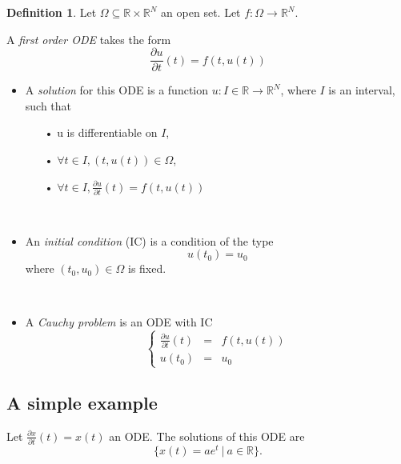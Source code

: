 \documentclass[10pt,a4paper]{article}
\theoremstyle{definition}
\newtheorem{definition}{Definition}
\theoremstyle{definition}
\theoremstyle{definition}
\begin{document}
\begin{definition}
Let $\Omega \subseteq \mathbb{R} \times \mathbb{R}^N$ an open set. Let $f: \Omega \rightarrow \mathbb{R}^N$. 

A \textit{first order ODE} takes the form
$$
\frac{\partial u}{\partial t}(t) = f(t,u(t))
$$

\begin{itemize}
\item A \textit{solution} for this ODE is a function $u : I\in \mathbb{R} \rightarrow \mathbb{R}^N$, where $I$ is an interval, such that
	\begin{itemize}
	\item[•] u is differentiable on $I$,
	\item[•] $\forall t \in I, (t, u(t)) \in \Omega$,
	\item[•] $\forall t \in I, \frac{\partial u}{\partial t}(t) = f(t, u(t))$
	\end{itemize}
~

\item An \textit{initial condition} (IC) is a condition of the type
$$
u(t_0) = u_0
$$
where $(t_0, u_0) \in \Omega$ is fixed.

~

\item A \textit{Cauchy problem} is an ODE with IC
$$
\left \{
\begin{array}{rcl}
\frac{\partial u}{\partial t}(t) & = & f(t, u(t)) \\
u(t_0) & = & u_0
\end{array}
\right.
$$
\end{itemize}
\end{definition}

%

\subsection{A simple example}
Let $\frac{\partial x}{\partial t}(t) = x(t)$ an ODE. The solutions of this ODE are
$$
\{ x(t) = ae^t\ |\ a\in \mathbb{R}\}.
$$
\end{document}
